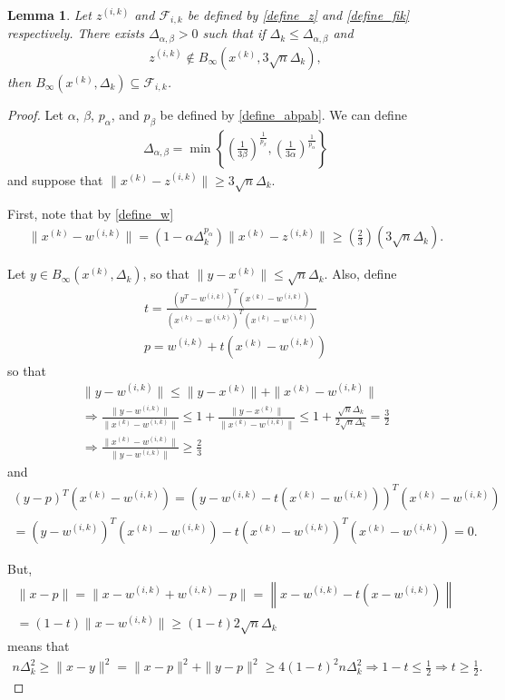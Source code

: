 \documentclass{article}
\newtheorem{lemma}[theorem]{Lemma}
\theoremstyle{case}
\numberwithin{theorem}{subsection}
\newcommand{\deltalargzik}{{\Delta_{\alpha,\beta}}}
\newcommand{\dk}{\Delta_k}
\newcommand{\fik}{{\mathcal F_{i, k}}}
\newcommand{\tr}{{ B_{\infty}\left(\xk, \dk\right) }}
\newcommand{\wik}{{w^{(i, k)}}}
\newcommand{\xk}{{x^{(k)}}}
\newcommand{\zik}{{z^{(i, k)}}}
\begin{document}
\begin{lemma}
\label{large_zik_means_means_no_intersection}
Let
$\zik$ and $\fik$
be defined by
\cref{define_z} and \cref{define_fik} respectively.
There exists $\deltalargzik > 0$ such that if $\dk \le \deltalargzik$ and 
\begin{align*}
\zik \not \in B_{\infty}(\xk, 3\sqrt{n}\dk),
\end{align*}
then $\tr \subseteq \fik$.
\end{lemma}
\begin{proof}
Let $\alpha$, $\beta$, $p_{\alpha}$, and $p_{\beta}$ be defined by \cref{define_abpab}.
We can define
\begin{align}
\deltalargzik = \min\left\{
\left(\frac 1 {3\beta }\right)^{\frac 1 {p_{\beta }}},
\left(\frac 1 {3\alpha}\right)^{\frac 1 {p_{\alpha}}}
\right\} \label{define_deltalargzik}
\end{align}
and suppose that $\|\xk - \zik\| \ge 3 \sqrt{n} \dk$.

First, note that by \cref{define_w}
\begin{align*}
\|\xk - \wik\| = (1 - \alpha\dk^{p_{\alpha}}) \|\xk - \zik\| \ge \left(\frac 2 3\right) \left(3\sqrt{n}\dk\right).
\end{align*}

Let $y \in \tr$, so that $\|y - \xk\| \le \sqrt{n}\dk$.
Also, define
\begin{align*}
t  = \frac{(y^T - \wik)^T(\xk - \wik)}{\left(\xk - \wik\right)^T(\xk - \wik)} \\
p = \wik + t\left(\xk - \wik\right)
\end{align*}
so that
\begin{align*}
\|y - \wik\| \le \|y - \xk\| + \|\xk - \wik\| \\
\Longrightarrow \frac{\|y - \wik\|}{\|\xk - \wik\|} \le 1 +  \frac{\|y - \xk\|}{\|\xk - \wik\|} \le 1 + \frac{\sqrt{n}\dk}{2 \sqrt{n}\dk} = \frac 3 2\\
\Longrightarrow \frac{\|\xk - \wik\|}{\|y - \wik\|} \ge \frac 2 3
\end{align*}
and
\begin{align*}
\left(y - p\right)^T\left(\xk - \wik\right) = 
\left(y - \wik - t\left(\xk - \wik\right)\right)^T\left(\xk - \wik\right) \\
= \left(y - \wik\right)^T\left(\xk - \wik\right) - t\left(\xk - \wik\right)^T\left(\xk - \wik\right) = 0.
\end{align*}

But,
\begin{align*}
\|x - p\| = \|x - \wik + \wik - p\| = \left\|x - \wik - t\left(x - \wik\right)\right\| \\
= (1-t)\|x - \wik\| \ge (1-t)2\sqrt{n}\dk
\end{align*}
means that
\begin{align*}
n\dk^2 \ge \|x - y\|^2 = \|x - p\|^2 + \|y - p\|^2 \ge 4(1-t)^2n\dk^2 
\Longrightarrow 1-t \le \frac 1 2 \Longrightarrow t \ge \frac 1 2.
\end{align*}


\end{proof}
\end{document}
